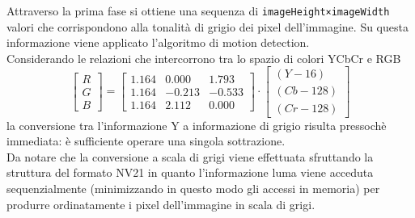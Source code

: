 Attraverso la prima fase si ottiene una sequenza di \texttt{imageHeight×imageWidth} valori che corrispondono alla tonalità di grigio dei pixel dell'immagine. Su questa informazione viene applicato l'algoritmo di motion detection.\\
Considerando le relazioni che intercorrono tra lo spazio di colori YCbCr e RGB
\[
\left[\begin{array}{c}R\\G\\B\end{array}\right] = \left[
\begin{array}{ccc}1.164&0.000&1.793\\1.164&-0.213&-0.533\\1.164&2.112&0.000\end{array}
\right]\cdot \left[\begin{array}{c}(Y-16)\\(Cb-128)\\(Cr-128)\end{array}\right]
\]
la conversione tra l'informazione Y a informazione di grigio risulta pressochè immediata: è sufficiente operare una singola sottrazione.\\
Da notare che la conversione a scala di grigi viene effettuata sfruttando la struttura del formato NV21 in quanto l'informazione luma viene acceduta sequenzialmente (minimizzando in questo modo gli accessi in memoria) per produrre ordinatamente i pixel dell'immagine in scala di grigi.\\

